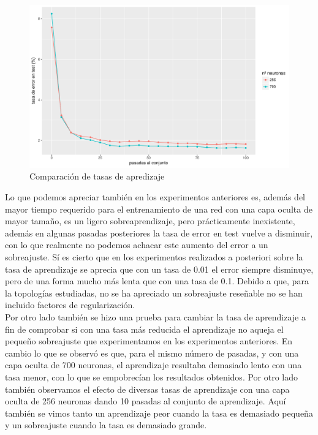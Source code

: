 \documentclass[10pt,a4paper]{article}
\begin{document}
\begin{figure}[H]
\includegraphics[scale=0.5]{img/cantidad.pdf}
\caption{Comparación de tasas de apredizaje}
\end{figure}

Lo que podemos apreciar también en los experimentos anteriores es, además del mayor tiempo requerido para el entrenamiento de una red con una capa oculta de mayor tamaño, es un ligero sobreaprendizaje, pero prácticamente inexistente, además en algunas pasadas posteriores la tasa de error en test vuelve a disminuir, con lo que realmente no podemos achacar este aumento del error a un sobreajuste. Sí es cierto que en los experimentos realizados a posteriori sobre la tasa de aprendizaje se aprecia que con un tasa de 0.01 el error siempre disminuye, pero de una forma mucho más lenta que con una tasa de 0.1. Debido a que, para la topologías estudiadas, no se ha apreciado un sobreajuste reseñable no se han incluido factores de regularización.\\

Por otro lado también se hizo una prueba para cambiar la tasa de aprendizaje a fin de comprobar si con una tasa más reducida el aprendizaje no aqueja el pequeño sobreajuste que experimentamos en los experimentos anteriores. En cambio lo que se observó es que, para el mismo número de pasadas, y con una capa oculta de 700 neuronas, el aprendizaje resultaba demasiado lento con una tasa menor, con lo que se empobrecían los resultados obtenidos. Por otro lado también observamos el efecto de diversas tasas de aprendizaje con una capa oculta de 256 neuronas dando 10 pasadas al conjunto de aprendizaje. Aquí también se vimos tanto un aprendizaje peor cuando la tasa es demasiado pequeña y un sobreajuste cuando la tasa es demasiado grande.
\end{document}
